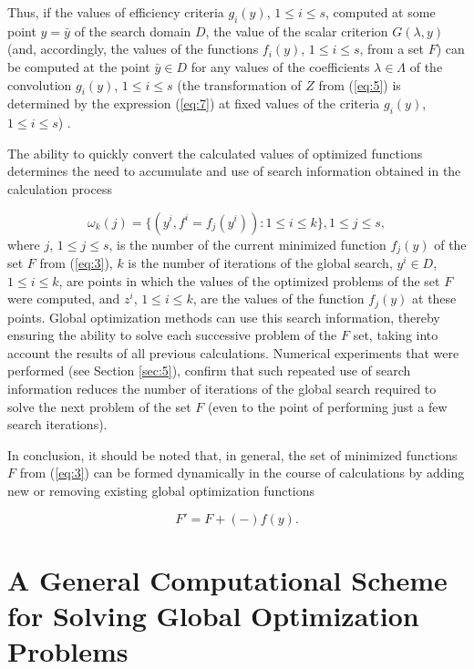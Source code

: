 \documentclass[review]{elsarticle}
\begin{document}
Thus, if the values of efficiency criteria $g_i(y)$, $1 \leq i \leq s$, computed at some point $y=\bar{y}$ of the search domain $D$, the value of the scalar criterion $G(\lambda,y)$ (and, accordingly, the values of the functions $f_i(y)$, $1 \leq i \leq s$, from a set $F$) can be computed at the point $\bar{y} \in D$ for any values of the coefficients $\lambda \in \Lambda$ of the convolution $g_i(y)$, $1 \leq i \leq s$ (the transformation of $Z$ from (\ref{eq:5}) is determined by the expression (\ref{eq:7}) at fixed values of the criteria $g_i(y)$, $1 \leq i \leq s$) \cite{c15,c16,c17}.

The ability to quickly convert the calculated values of optimized functions determines the need to accumulate and use of search information obtained in the calculation process

\begin{equation}\label{eq:9}
\omega_k (j)=\{(y^i,f^i=f_j(y^i)):1 \leq i \leq k \},1 \leq j \leq s,
\end{equation}
where $j$, $1 \leq j \leq s$, is the number of the current minimized function $f_j(y)$ of the set $F$ from (\ref{eq:3}), $k$ is the number of iterations of the global search, $y^i \in D$, $1 \leq i \leq k$,  are points in which the values of the optimized problems of the set $F$ were computed, and $z^i$, $1 \leq i \leq k$, are the values of the function $f_j(y)$ at these points. Global optimization methods can use this search information, thereby ensuring the ability to solve each successive problem of the $F$ set, taking into account the results of all previous calculations. Numerical experiments that were performed (see Section \ref{sec:5}), confirm that such repeated use of search information reduces the number of iterations of the global search required to solve the next problem of the set $F$ (even to the point of performing just a few search iterations).

In conclusion, it should be noted that, in general, the set of minimized functions $F$ from (\ref{eq:3}) can be formed dynamically in the course of calculations by adding new or removing existing global optimization functions

\begin{equation}\label{eq:10}
F'=F+(-) f(y).
\end{equation}


\section{A General Computational Scheme for Solving Global Optimization Problems}\label{sec:3}
\end{document}

